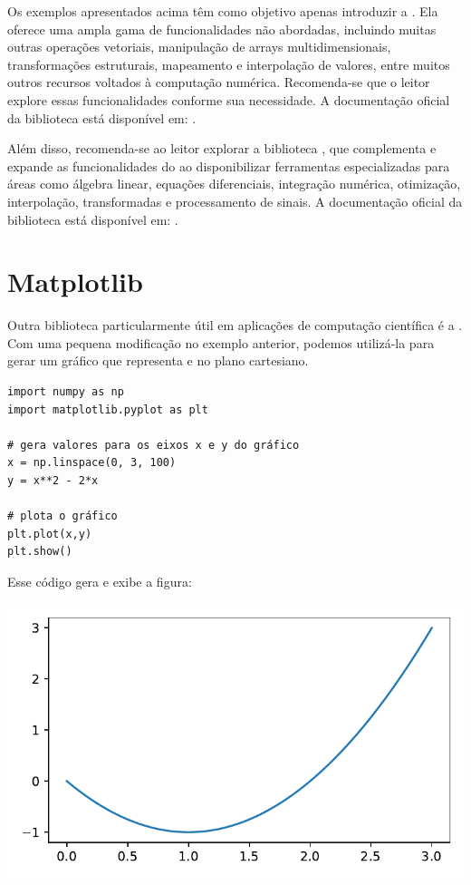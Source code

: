 Os exemplos apresentados acima têm como objetivo apenas introduzir a .
Ela oferece uma ampla gama de funcionalidades não abordadas, incluindo muitas outras operações vetoriais, manipulação
de arrays multidimensionais, transformações estruturais, mapeamento e interpolação de valores, entre muitos outros
recursos voltados à computação numérica.
Recomenda-se que o leitor explore essas funcionalidades conforme sua necessidade.
A documentação oficial da biblioteca está disponível em: .


Além disso, recomenda-se ao leitor explorar a biblioteca , que complementa e expande as funcionalidades
do  ao disponibilizar ferramentas especializadas para áreas como álgebra linear, equações diferenciais,
integração numérica, otimização, interpolação, transformadas e processamento de sinais.
A documentação oficial da biblioteca está disponível em: .


\section{Matplotlib}

Outra biblioteca particularmente útil em aplicações de computação científica é a .
Com uma pequena modificação no exemplo anterior, podemos utilizá-la para gerar um gráfico que representa
 e  no plano cartesiano.
\begin{verbatim}
import numpy as np
import matplotlib.pyplot as plt

# gera valores para os eixos x e y do gráfico
x = np.linspace(0, 3, 100)
y = x**2 - 2*x

# plota o gráfico
plt.plot(x,y)
plt.show()
\end{verbatim}

Esse código gera e exibe a figura:
\begin{center}
    \includegraphics[scale=1.0]{figs/parabola}
\end{center}

